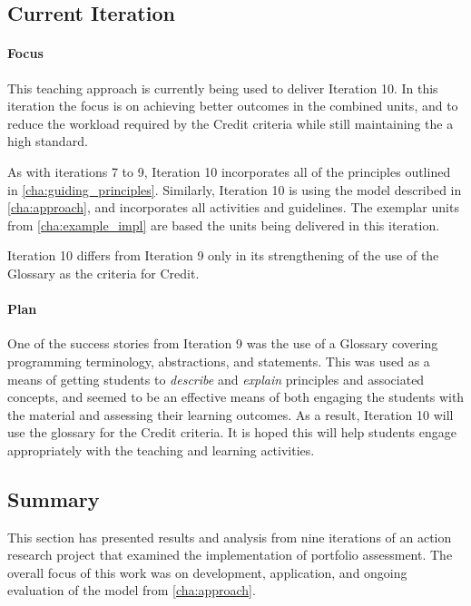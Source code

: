 
\subsection{Current Iteration} %

\paragraph{Focus}
This teaching approach is currently being used to deliver Iteration 10. In this iteration the focus is on achieving better outcomes in the combined units, and to reduce the workload required by the Credit criteria while still maintaining the a high standard.

As with iterations 7 to 9, Iteration 10 incorporates all of the principles outlined in \cref{cha:guiding_principles}. Similarly, Iteration 10 is using the model described in \cref{cha:approach}, and incorporates all activities and guidelines. The exemplar units from \cref{cha:example_impl} are based the units being delivered in this iteration.

Iteration 10 differs from Iteration 9 only in its strengthening of the use of the Glossary as the criteria for Credit.

\paragraph{Plan}
One of the success stories from Iteration 9 was the use of a Glossary covering programming terminology, abstractions, and statements. This was used as a means of getting students to \emph{describe} and \emph{explain} principles and associated concepts, and seemed to be an effective means of both engaging the students with the material and assessing their learning outcomes. As a result, Iteration 10 will use the glossary for the Credit criteria. It is hoped this will help students engage appropriately with the teaching and learning activities.


\subsection{Summary} %
\label{sub:action_summary}

This section has presented results and analysis from nine iterations of an action research project that examined the implementation of portfolio assessment. The overall focus of this work was on development, application, and ongoing evaluation of the model from \cref{cha:approach}.

